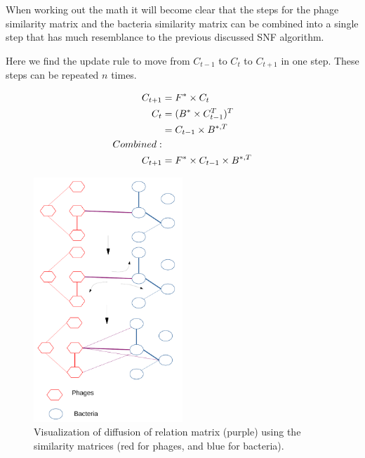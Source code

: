 \documentclass{article}
\begin{document}
When working out the math it will become clear that the steps for the phage
similarity matrix and the bacteria similarity matrix can be combined into 
a single step that has much resemblance to the previous discussed SNF algorithm. 

\begin{minipage}{\textwidth}
Here we find the update rule to move from $C_{t-1}$ to $C_{t}$ to $C_{t+1}$ in 
one step. These steps can be repeated $n$ times.

\begin{align}
    \begin{split}
    C_{t+1} &= F^* \times C_t \\
    C_{t} &= (B^* \times C_{t - 1}^{T})^{T} \\
          &= C_{t - 1} \times B^{*,T} \\
    \hfil Combined: \\
    C_{t+1} &= F^* \times C_{t - 1} \times B^{*,T}
    \end{split}
\end{align}

\end{minipage}

\hfill

\begin{figure}[hb]
    \centering
    \includegraphics[width=0.5\textwidth]{img/phage-bac-diffusion_cropped.pdf}
    \caption{Visualization of diffusion of relation matrix (purple) using the similarity matrices (red for phages, and blue for bacteria).}\label{fig:phagediff}
\end{figure}
\end{document}
